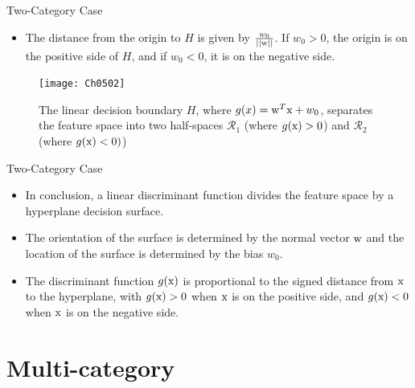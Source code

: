 \begin{frame}{Two-Category Case}
\begin{itemize}
\item The distance from the origin to $H$ is given by $\frac{w_0}{||{\rm w}||}$. If $w_0>0$, the origin is on the positive side of $H$, and if $w_0<0$, it is on the negative side.
\end{itemize}
\begin{figure}
\texttt{[image: Ch0502]}
\caption{The linear decision boundary $H$, where $g(x)={\rm w}^T{\rm x}+w_0$, separates the feature space into two half-spaces $\mathcal{R}_1$ (where $g({\rm  x})>0$) and $\mathcal{R}_2$ (where $g({\rm x})<0)$)}
\end{figure}
\end{frame}

\begin{frame}{Two-Category Case}
\begin{itemize}
\item In conclusion, a linear discriminant function divides the feature space by a hyperplane decision surface.
\item The orientation of the surface is determined by the normal vector ${\rm w}$ and the location of the surface is determined by the bias $w_0$.
\item The discriminant function $g({\rm x})$ is proportional to the signed distance from ${\rm x}$ to the hyperplane, with $g({\rm x})>0$ when ${\rm x}$ is on the positive side, and $g({\rm x})<0$ when ${\rm x}$ is on the negative side.
\end{itemize}
\end{frame}

\section{Multi-category}
